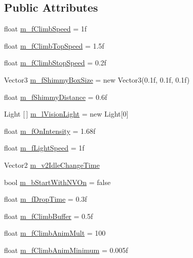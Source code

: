 \subsection*{Public Attributes}
\begin{DoxyCompactItemize}
\item 
float \mbox{\hyperlink{class_loris_ad704caa18e48116db085af96db58acd3}{m\+\_\+f\+Climb\+Speed}} = 1f
\item 
float \mbox{\hyperlink{class_loris_a141ebd60dc9439a00f94affa2d0ec5e7}{m\+\_\+f\+Climb\+Top\+Speed}} = 1.\+5f
\item 
float \mbox{\hyperlink{class_loris_afbb9d1bac775eacd615dc1489327f3e8}{m\+\_\+f\+Climb\+Stop\+Speed}} = 0.\+2f
\item 
Vector3 \mbox{\hyperlink{class_loris_a5670a1a0e9f65b9146215986a49c3e56}{m\+\_\+f\+Shimmy\+Box\+Size}} = new Vector3(0.\+1f, 0.\+1f, 0.\+1f)
\item 
float \mbox{\hyperlink{class_loris_a1f41085121cb3240e345a2d53bd5e840}{m\+\_\+f\+Shimmy\+Distance}} = 0.\+6f
\item 
Light \mbox{[}$\,$\mbox{]} \mbox{\hyperlink{class_loris_a9fe9fb5f26fa4f270af644bcb9b25928}{m\+\_\+l\+Vision\+Light}} = new Light\mbox{[}0\mbox{]}
\item 
float \mbox{\hyperlink{class_loris_a89041a7720a6ae252dd13b81648892e5}{m\+\_\+f\+On\+Intensity}} = 1.\+68f
\item 
float \mbox{\hyperlink{class_loris_a364370951ea508ff14e22dfa5aeca15c}{m\+\_\+f\+Light\+Speed}} = 1f
\item 
Vector2 \mbox{\hyperlink{class_loris_afff951d4ffc192f4dba6f2686dd56cc3}{m\+\_\+v2\+Idle\+Change\+Time}}
\item 
bool \mbox{\hyperlink{class_loris_a638ddfa87af7ce10bedad80d2351c288}{m\+\_\+b\+Start\+With\+N\+V\+On}} = false
\item 
float \mbox{\hyperlink{class_loris_ae88da935b4f5503437e00306a5c96f10}{m\+\_\+f\+Drop\+Time}} = 0.\+3f
\item 
float \mbox{\hyperlink{class_loris_a67c3123eb7a601fd6a01ee8551e9922b}{m\+\_\+f\+Climb\+Buffer}} = 0.\+5f
\item 
float \mbox{\hyperlink{class_loris_a46c347f318e42fee40899930955ffb47}{m\+\_\+f\+Climb\+Anim\+Mult}} = 100
\item 
float \mbox{\hyperlink{class_loris_a27903c2a983dc22ff7300b4bd556cc24}{m\+\_\+f\+Climb\+Anim\+Minimum}} = 0.\+005f
\end{DoxyCompactItemize}
